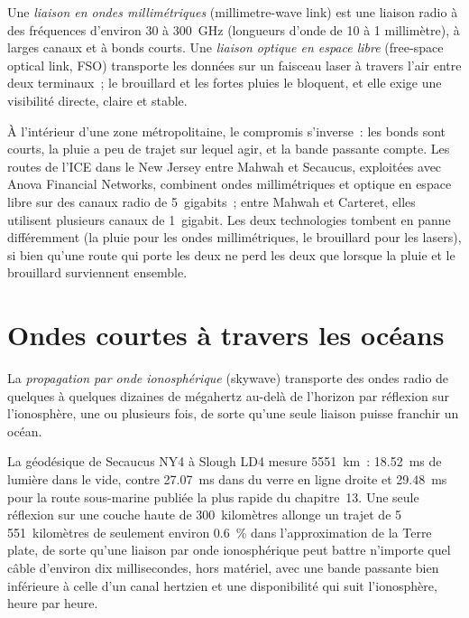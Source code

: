 \begin{definition}\label{def:nw:long-haul-wireless:mmw}
Une \emph{liaison en ondes millimétriques} (millimetre-wave link) est une liaison radio à des fréquences d'environ 30 à 300~GHz (longueurs d'onde de 10 à 1
millimètre), à larges canaux et à bonds courts. Une \emph{liaison optique en espace libre} (free-space optical link, FSO) transporte les données sur un faisceau laser
à travers l'air entre deux terminaux~; le brouillard et les fortes pluies le bloquent, et elle exige une visibilité directe, claire et stable.
\end{definition}

À l'intérieur d'une zone métropolitaine, le compromis s'inverse~: les bonds sont courts, la pluie a peu de trajet sur lequel agir, et la bande passante compte. Les routes de l'ICE dans le New Jersey
entre Mahwah et Secaucus, exploitées avec Anova Financial Networks, combinent ondes millimétriques et optique en espace libre sur des canaux radio de 5~gigabits~;
entre Mahwah et Carteret, elles utilisent plusieurs canaux de 1~gigabit. Les deux technologies tombent en panne différemment (la pluie pour les ondes millimétriques,
le brouillard pour les lasers), si bien qu'une route qui porte les deux ne perd les deux que lorsque la pluie et le brouillard surviennent ensemble.

\section{Ondes courtes à travers les océans}

\begin{definition}\label{def:nw:long-haul-wireless:sky}
La \emph{propagation par onde ionosphérique} (skywave) transporte des ondes radio de quelques à quelques dizaines de mégahertz au-delà de l'horizon par réflexion sur
l'ionosphère, une ou plusieurs fois, de sorte qu'une seule liaison puisse franchir un océan.
\end{definition}

La géodésique de Secaucus NY4 à Slough LD4 mesure \qty{5551}{\kilo\metre}~: \qty{18.52}{\milli\second} de lumière dans le vide, contre
\qty{27.07}{\milli\second} dans du verre en ligne droite et \qty{29.48}{\milli\second} pour la route sous-marine publiée la plus rapide du chapitre~13. Une seule réflexion
sur une couche haute de 300~kilomètres allonge un trajet de 5\,551~kilomètres de seulement environ 0.6~\% dans l'approximation de la Terre plate, de sorte qu'une liaison par onde ionosphérique peut
battre n'importe quel câble d'environ dix millisecondes, hors matériel, avec une bande passante bien inférieure à celle d'un canal hertzien et une disponibilité qui suit l'ionosphère, heure par heure.

